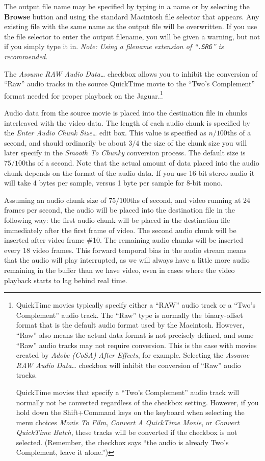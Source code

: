 \documentclass[12pt,letterpaper,twoside]{article}
\begin{document}
The output file name may be specified by typing in a name or by selecting the \textbf{Browse} button
and using the standard Macintosh file selector that appears. Any existing file with the same name as
the output file will be overwritten. If you use the file selector to enter the output filename, you
will be given a warning, but not if you simply type it in. \textit{Note: Using a filename extension
of ``\texttt{.SRG}'' is recommended.}

The \textit{Assume RAW Audio Data\ldots} checkbox allows you to inhibit the conversion of ``Raw''
audio tracks in the source QuickTime movie to the ``Two's Complement'' format needed for proper
playback on the Jaguar.\footnote{QuickTime movies typically specify either a ``RAW'' audio track or
a ``Two's Complement'' audio track. The ``Raw'' type is normally the binary-offset format that is
the default audio format used by the Macintosh. However, ``Raw'' also means the actual data format
is not precisely defined, and some ``Raw'' audio tracks may not require conversion. This is the case
with movies created by \textit{Adobe (CoSA) After Effects}, for example. Selecting the \textit{Assume
RAW Audio Data\ldots} checkbox will inhibit the conversion of ``Raw'' audio tracks.

QuickTime movies that specify a ``Two's Complement'' audio track will normally not be converted
regardless of the checkbox setting. However, if you hold down the Shift+Command keys on the
keyboard when selecting the menu choices \textit{Movie To Film}, \textit{Convert A QuickTime Movie},
or \textit{Convert QuickTime Batch}, these tracks will be converted if the checkbox is not selected.
(Remember, the checkbox says ``the audio is already Two's Complement, leave it alone.'')}

Audio data from the source movie is placed into the destination file in chunks interleaved with the
video data. The length of each audio chunk is specified by the \textit{Enter Audio Chunk Size\ldots}
edit box. This value is specified as $n/100$ths of a second, and should ordinarily be about $3/4$
the size of the chunk size you will later specify in the \textit{Smooth To Chunky} conversion
process. The default size is $75/100$ths of a second. Note that the actual amount of data placed
into the audio chunk depends on the format of the audio data. If you use 16-bit stereo audio it
will take 4 bytes per sample, versus 1 byte per sample for 8-bit mono.

Assuming an audio chunk size of $75/100$ths of second, and video running at 24 frames per second,
the audio will be placed into the destination file in the following way: the first audio chunk will
be placed in the destination file immediately after the first frame of video. The second audio chunk
will be inserted after video frame \#10. The remaining audio chunks will be inserted every 18 video
frames. This forward temporal bias in the audio stream means that the audio will play interrupted,
as we will always have a little more audio remaining in the buffer than we have video, even in cases
where the video playback starts to lag behind real time.
\end{document}
